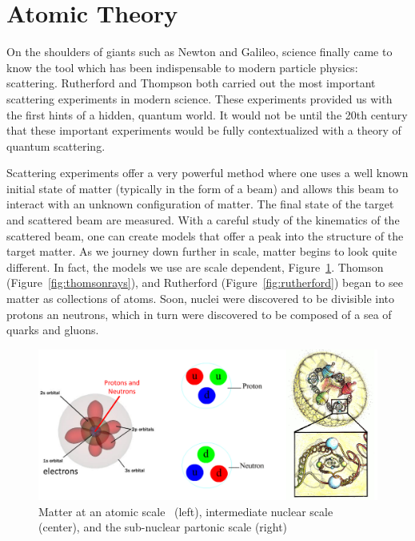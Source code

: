 \clearpage
\section{Atomic Theory}

On the shoulders of giants such as Newton and Galileo, science finally came to
know the tool which has been indispensable to modern particle physics:
scattering. Rutherford and Thompson both carried out the most important
scattering experiments in modern science. These experiments provided us with
the first hints of a hidden, quantum world. It would not be until the 20th
century that these important experiments would be fully contextualized with a
theory of quantum scattering.

Scattering experiments offer a very powerful method where one uses a well known
initial state of matter (typically in the form of a beam) and allows this beam
to interact with an unknown configuration of matter. The final state of the
target and scattered beam are measured. With a careful study of the kinematics
of the scattered beam, one can create models that offer a peak into the
structure of the target matter. As we journey down further in scale, matter
begins to look quite different.  In fact, the models we use are scale dependent,
Figure~\ref{fig:scale_of_matter}. Thomson (Figure~\ref{fig:thomsonrays}), and
Rutherford (Figure~\ref{fig:rutherford}) began to see matter as collections of
atoms.  Soon, nuclei were discovered to be divisible into protons an neutrons,
which in turn were discovered to be composed of a sea of quarks and gluons.

\begin{figure}[ht]
	\centering
	\includegraphics[width=\linewidth]{./figures/scale_of_matter.png}
	\caption{
    Matter at an atomic scale~\cite{Freudenrich2001} (left), intermediate
    nuclear scale~\cite{Manisearth2010} (center), and the sub-nuclear partonic
    scale (right)~\cite{Morreale2009}
	}
	\label{fig:scale_of_matter}
\end{figure}

